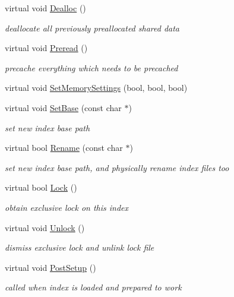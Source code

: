 \begin{DoxyCompactItemize}
virtual void \hyperlink{classCSphTokenizerIndex_ae54fde262e7c89070e855f22c7ee6f15}{Dealloc} ()
\begin{DoxyCompactList}\small\item\em deallocate all previously preallocated shared data \end{DoxyCompactList}\item 
virtual void \hyperlink{classCSphTokenizerIndex_af75e44b119d0658c52568629eca49d9a}{Preread} ()
\begin{DoxyCompactList}\small\item\em precache everything which needs to be precached \end{DoxyCompactList}\item 
virtual void \hyperlink{classCSphTokenizerIndex_a5ff140f79a766fe4c8600b71ac145013}{Set\-Memory\-Settings} (bool, bool, bool)
\item 
virtual void \hyperlink{classCSphTokenizerIndex_ab346428334d1eff03576544d70c55a0b}{Set\-Base} (const char $\ast$)
\begin{DoxyCompactList}\small\item\em set new index base path \end{DoxyCompactList}\item 
virtual bool \hyperlink{classCSphTokenizerIndex_a06ac573ed03c271d1bfc53396cce3b3c}{Rename} (const char $\ast$)
\begin{DoxyCompactList}\small\item\em set new index base path, and physically rename index files too \end{DoxyCompactList}\item 
virtual bool \hyperlink{classCSphTokenizerIndex_a1e1e084223bcf040ce5adb03ac1dd7c1}{Lock} ()
\begin{DoxyCompactList}\small\item\em obtain exclusive lock on this index \end{DoxyCompactList}\item 
virtual void \hyperlink{classCSphTokenizerIndex_adaa5d3e9f2380516f107fed8468f7112}{Unlock} ()
\begin{DoxyCompactList}\small\item\em dismiss exclusive lock and unlink lock file \end{DoxyCompactList}\item 
virtual void \hyperlink{classCSphTokenizerIndex_a81be68c9a598f5f0ca3cf5c2a84f97ac}{Post\-Setup} ()
\begin{DoxyCompactList}\small\item\em called when index is loaded and prepared to work \end{DoxyCompactList}\item 

\end{DoxyCompactItemize}
